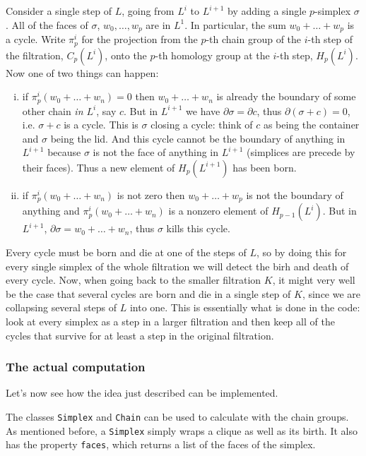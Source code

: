 \documentclass[../main.tex]{subfiles}
\begin{document}
Consider a single step of \( L \), going from \( L^i \) to \( L^{i+1} \) by adding a
single \( p \)-simplex \( \sigma \). All of the faces of \( \sigma \), \( w_0, \dots, w_p
\) are in \( L^1 \). In particular, the sum \( w_0 + \dots + w_p \) is a cycle. Write \( \pi_p^i \) for the projection from the \( p \)-th chain
group of the \( i \)-th step of the filtration, \( C_p(L^i) \), onto the \( p \)-th
homology group at the \( i \)-th step, \( H_p(L^i) \). Now one of
two things can happen:
\begin{enumerate}[(i)]
	\item if \( \pi_p^i(w_0 + \dots + w_n) = 0 \) then \( w_0 + \dots + w_n \) is already
		the boundary of some other chain \emph{in \( L^i \)}, say \( c \). But in \( L^{i+1}
		\) we have \( \partial \sigma = \partial c \), thus \( \partial(\sigma + c) = 0 \),
		i.e. \( \sigma + c \) is a cycle. This is \( \sigma \) closing a cycle: think of \( c
		\) as being the container and \( \sigma \) being the lid. And this cycle cannot be the
		boundary of anything in \( L^{i+1} \) because \( \sigma \) is not the face of anything
		in \( L^{i+1} \) (simplices are precede by their faces). Thus a new element of \(
		H_p(L^{i+1}) \) has been born. 
	\item if \( \pi_p^i(w_0 + \dots + w_n) \) is not zero then \( w_0 + \dots + w_p \) is
		not the boundary of anything and \( \pi_p^i(w_0 + \dots + w_n) \) is a nonzero element
		of \( H_{p-1}(L^i) \). But in \( L^{i+1} \), \( \partial \sigma = w_0 + \dots + w_n
		\), thus \( \sigma \) kills this cycle. 
\end{enumerate}
Every cycle must be born and die at one of the steps of \( L \), so by doing this for
every single simplex of the whole filtration we will detect the birh and death of every
cycle. Now, when going back to the smaller filtration \( K \), it might very well be the
case that several cycles are born and die in a single step of \( K \), since we are
collapsing several steps of \( L \) into one. This is essentially what is done in the code:
look at every simplex as a step in a larger filtration and then keep all of the cycles
that survive for at least a step in the original filtration. 

\subsubsection{The actual computation}
Let's now see how the idea just described can be implemented. 

The classes \texttt{Simplex} and \texttt{Chain} can be used to calculate with the chain
groups. As mentioned before, a \texttt{Simplex} simply wraps a clique as well as its
birth. It also has the property \texttt{faces}, which returns a list of the faces of the
simplex.
\end{document}
